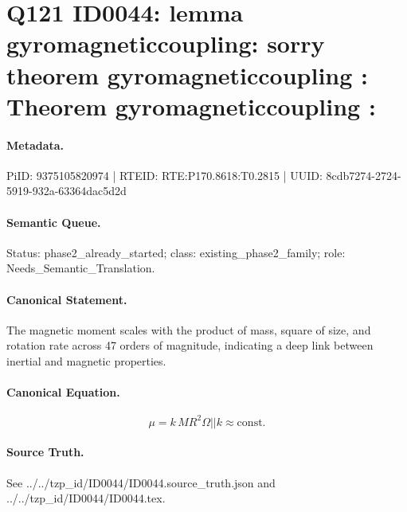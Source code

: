 \section*{Q121 ID0044: lemma gyromagneticcoupling: sorry theorem gyromagneticcoupling : Theorem gyromagneticcoupling :}
\paragraph{Metadata.}
PiID: 9375105820974 | RTEID: RTE:P170.8618:T0.2815 | UUID: 8cdb7274-2724-5919-932a-63364dac5d2d

\paragraph{Semantic Queue.}
Status: phase2\_already\_started; class: existing\_phase2\_family; role: Needs\_Semantic\_Translation.

\paragraph{Canonical Statement.}
The magnetic moment scales with the product of mass, square of size, and rotation rate across 47 orders of magnitude, indicating a deep link between inertial and magnetic properties.

\paragraph{Canonical Equation.}
\[
\mu = k\,M R^{2}\Omega || k \approx \mathrm{const.}
\]

\paragraph{Source Truth.}
See ../../tzp\_id/ID0044/ID0044.source\_truth.json and ../../tzp\_id/ID0044/ID0044.tex.
